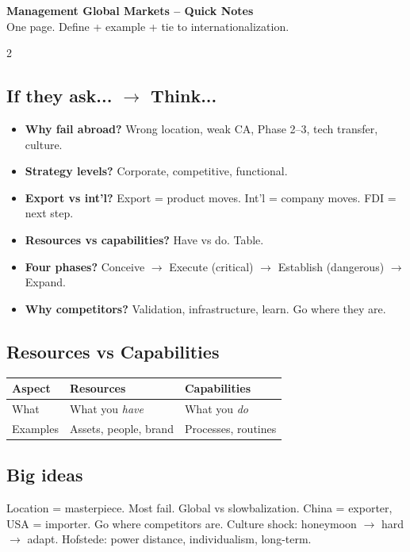 \documentclass[10pt,landscape,a4paper]{article}
\begin{document}
\normalsize

\begin{center}
{\LARGE\bfseries\color{accent} Management Global Markets -- Quick Notes}\\[0.3em]
\small One page. Define + example + tie to internationalization.
\end{center}
\vspace{0.5em}

\begin{multicols}{2}

\subsection*{\color{accent} If they ask... $\to$ Think...}
\begin{itemize}[leftmargin=*,nosep]
\item \textbf{Why fail abroad?} Wrong location, weak CA, Phase 2--3, tech transfer, culture.
\item \textbf{Strategy levels?} Corporate, competitive, functional.
\item \textbf{Export vs int'l?} Export = product moves. Int'l = company moves. FDI = next step.
\item \textbf{Resources vs capabilities?} Have vs do. Table.
\item \textbf{Four phases?} Conceive $\to$ Execute (critical) $\to$ Establish (dangerous) $\to$ Expand.
\item \textbf{Why competitors?} Validation, infrastructure, learn. Go where they are.
\end{itemize}

\subsection*{\color{accent} Resources vs Capabilities}
\begin{center}
\small
\begin{tabular}{@{}lll@{}}
\toprule
\textbf{Aspect} & \textbf{Resources} & \textbf{Capabilities} \\
\midrule
What & What you \textit{have} & What you \textit{do} \\
Examples & Assets, people, brand & Processes, routines \\
\bottomrule
\end{tabular}
\end{center}

\subsection*{\color{accent} Big ideas}
Location = masterpiece. Most fail. Global vs slowbalization. China = exporter, USA = importer. Go where competitors are. Culture shock: honeymoon $\to$ hard $\to$ adapt. Hofstede: power distance, individualism, long-term.


\end{multicols}
\end{document}
